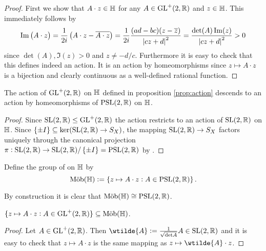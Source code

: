 \begin{proof}
	First we show that $A \cdot z \in \mathbb{H}$ for any $A \in \mathrm{GL}^+(2,\mathbb{R})$ and $z \in \mathbb{H}$. This immediately follows by
	\begin{equation}
\Im\del[1]{A \cdot z} = \frac{1}{2i}\del[1]{A \cdot z - \overline{A \cdot z}} = \frac{1}{2i}\frac{(ad - bc)(z - \overline{z})}{\abs[0]{cz + d}^2} = \frac{\det(A)\Im(z)}{\abs[0]{cz + d}^2} > 0
		\label{eq:imaginary_part}
	\end{equation}
	\noindent since $\det(A),\Im(z) > 0$ and $z \neq -d/c$. Furthermore it is easy to check that this defines indeed an action. It is an action by homeomorphisms since $z \mapsto A \cdot z$ is a bijection and clearly continuous as a well-defined rational function. 
\end{proof}

\begin{corollary}
	The action of $\mathrm{GL}^+(2,\mathbb{R})$ on $\mathbb{H}$ defined in proposition \ref{prop:action} descends to an action by homeomorphisms of $\mathrm{PSL}(2,\mathbb{R})$ on $\mathbb{H}$.
\end{corollary}

\begin{proof}
	Since $\mathrm{SL}(2,\mathbb{R}) \leq \mathrm{GL}^+(2,\mathbb{R})$ the action restricts to an action of $\mathrm{SL}(2,\mathbb{R})$ on $\mathbb{H}$. Since $\cbr[0]{\pm I} \subseteq \ker(\SLrm(2,\Rbb) \to S_X)$, the mapping $\mathrm{SL}(2,\mathbb{R}) \to S_X$ factors uniquely through the canonical projection $\pi : \SLrm(2,\Rbb) \to \SLrm(2,\Rbb)/\cbr[0]{\pm I} = \PSLrm(2,\Rbb)$ by \cite[23]{grillet:abstract_algebra:2007}.	
\end{proof}

\begin{definition}
	Define the group of  on $\mathbb{H}$ by
	\begin{equation}
		\Mob(\Hbb) := \cbr[0]{z \mapsto A \cdot z : A \in \PSLrm(2,\Rbb)}.
	\end{equation}
\end{definition}

\begin{remark}
	By construction it is clear that $\mathrm{M\ddot{o}b}(\mathbb{H}) \cong \mathrm{PSL}(2,\mathbb{R})$.
\end{remark}

\begin{proposition}
	$\cbr[0]{z \mapsto A \cdot z : A \in \GLrm^+(2,\Rbb)} \subseteq \Mob(\Hbb)$.
\end{proposition}

\begin{proof}
	Let $A \in \mathrm{GL}^+(2,\mathbb{R})$. Then $\wtilde{A} := \frac{1}{\sqrt{\det A}}A \in \SLrm(2,\Rbb)$ and it is easy to check that $z \mapsto A \cdot z$ is the same mapping as $z \mapsto \wtilde{A} \cdot z$.
\end{proof}

